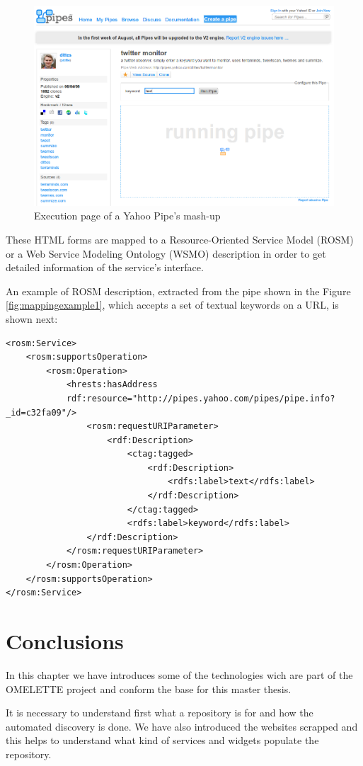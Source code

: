 \begin{figure}[ht!]
\centering
\includegraphics[width=350pt]{graphics/yahoopipesmashup.png}
\caption{Execution page of a Yahoo Pipe's mash-up}
\label{fig:yahoopipesmash-up}
\end{figure}

These HTML forms are mapped to a Resource-Oriented Service Model (ROSM) or a Web Service Modeling Ontology (WSMO) description in order to get detailed information of the
service's interface. 

\newpage
An example of ROSM description, extracted from the pipe shown in the Figure \ref{fig:mappingexample1}, which accepts a set of textual keywords on a URL, is shown next:


\begin{lstlisting}[style=listXML,caption={Example ROSM definition}]
<rosm:Service>
	<rosm:supportsOperation>
		<rosm:Operation>
			<hrests:hasAddress
			rdf:resource="http://pipes.yahoo.com/pipes/pipe.info?_id=c32fa09"/>
				<rosm:requestURIParameter>
					<rdf:Description>
						<ctag:tagged>
							<rdf:Description>
								<rdfs:label>text</rdfs:label>
							</rdf:Description>
						</ctag:tagged>
						<rdfs:label>keyword</rdfs:label>
				</rdf:Description>
			</rosm:requestURIParameter>
		</rosm:Operation>
	</rosm:supportsOperation>
</rosm:Service>

\end{lstlisting}

\section{Conclusions}

In this chapter we have introduces some of the technologies wich are part of the OMELETTE project and conform the base for this master thesis.

It is necessary to understand first what a repository is for and how the automated discovery is done. We have also introduced the websites scrapped and this helps to understand what kind of services and widgets populate the repository.





